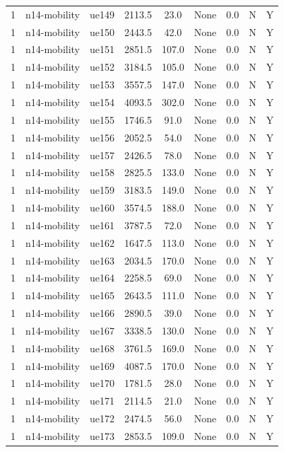 \begin{table}[ht]
\begin{tabular}{|c|c|c|c|c|c|c|c|c|}
1 & n14-mobility & ue149 & 2113.5 & 23.0 & None & 0.0 & N & Y \\
1 & n14-mobility & ue150 & 2443.5 & 42.0 & None & 0.0 & N & Y \\
1 & n14-mobility & ue151 & 2851.5 & 107.0 & None & 0.0 & N & Y \\
1 & n14-mobility & ue152 & 3184.5 & 105.0 & None & 0.0 & N & Y \\
1 & n14-mobility & ue153 & 3557.5 & 147.0 & None & 0.0 & N & Y \\
1 & n14-mobility & ue154 & 4093.5 & 302.0 & None & 0.0 & N & Y \\
1 & n14-mobility & ue155 & 1746.5 & 91.0 & None & 0.0 & N & Y \\
1 & n14-mobility & ue156 & 2052.5 & 54.0 & None & 0.0 & N & Y \\
1 & n14-mobility & ue157 & 2426.5 & 78.0 & None & 0.0 & N & Y \\
1 & n14-mobility & ue158 & 2825.5 & 133.0 & None & 0.0 & N & Y \\
1 & n14-mobility & ue159 & 3183.5 & 149.0 & None & 0.0 & N & Y \\
1 & n14-mobility & ue160 & 3574.5 & 188.0 & None & 0.0 & N & Y \\
1 & n14-mobility & ue161 & 3787.5 & 72.0 & None & 0.0 & N & Y \\
1 & n14-mobility & ue162 & 1647.5 & 113.0 & None & 0.0 & N & Y \\
1 & n14-mobility & ue163 & 2034.5 & 170.0 & None & 0.0 & N & Y \\
1 & n14-mobility & ue164 & 2258.5 & 69.0 & None & 0.0 & N & Y \\
1 & n14-mobility & ue165 & 2643.5 & 111.0 & None & 0.0 & N & Y \\
1 & n14-mobility & ue166 & 2890.5 & 39.0 & None & 0.0 & N & Y \\
1 & n14-mobility & ue167 & 3338.5 & 130.0 & None & 0.0 & N & Y \\
1 & n14-mobility & ue168 & 3761.5 & 169.0 & None & 0.0 & N & Y \\
1 & n14-mobility & ue169 & 4087.5 & 170.0 & None & 0.0 & N & Y \\
1 & n14-mobility & ue170 & 1781.5 & 28.0 & None & 0.0 & N & Y \\
1 & n14-mobility & ue171 & 2114.5 & 21.0 & None & 0.0 & N & Y \\
1 & n14-mobility & ue172 & 2474.5 & 56.0 & None & 0.0 & N & Y \\
1 & n14-mobility & ue173 & 2853.5 & 109.0 & None & 0.0 & N & Y \\

\end{tabular}
\end{table}
